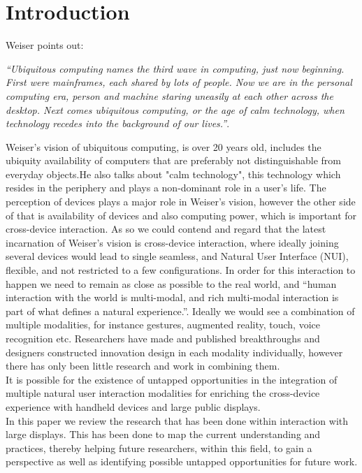 \section{Introduction}
Weiser\cite{Weiser:1991} points out:
 
{\em``Ubiquitous computing names the third wave in computing, just now beginning. First were mainframes, each shared by lots of people. Now we are in the personal computing era, person and machine staring uneasily at each other across the desktop. Next comes ubiquitous computing, or the age of calm technology, when technology recedes into the background of our lives.''}.

Weiser's vision of ubiquitous computing, is over 20 years old, includes the ubiquity availability of computers that are preferably not distinguishable from everyday objects.He also talks about "calm technology", this technology which resides in the periphery and plays a non-dominant role in a user's life. The perception of devices plays a major role in Weiser's vision, however the other side of that is availability of devices and also computing power, which is important for cross-device interaction. As so we could contend and regard that the latest incarnation of Weiser's vision is cross-device interaction, where ideally joining several devices would lead to single seamless, and Natural User Interface (NUI), flexible, and not restricted to a few configurations\cite{Radle:2015}.
In order for this interaction to happen we need to remain as close as possible to the real world, and ``human interaction with the world is multi-modal, and rich multi-modal interaction is part of what defines a natural experience.''\cite{Jain:2011}. 
Ideally we would see a combination of multiple modalities, for instance gestures, augmented reality, touch, voice recognition etc. 
Researchers have made and published breakthroughs and designers constructed innovation design in each modality individually, however there has only been little research and work in combining them.\cite{Jain:2011} \\

It is possible for the existence of untapped opportunities in the integration of multiple natural user interaction modalities for enriching the cross-device experience with handheld devices and large public displays. \\

In this paper we review the research that has been done within interaction with large displays. 
This has been done to map the current understanding and practices, thereby helping future researchers, within this field, to gain a perspective as well as identifying possible untapped opportunities for future work.